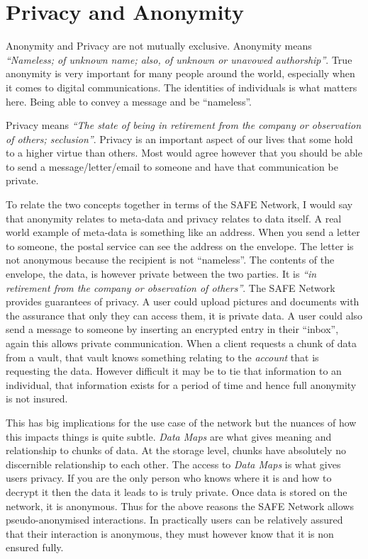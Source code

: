 \section{Privacy and Anonymity}

Anonymity and Privacy are not mutually exclusive. Anonymity means \textit{``Nameless; of unknown name; also, of unknown or unavowed authorship''}\cite{anonymous}. True anonymity is very important for many people around the world, especially when it comes to digital communications. The identities of individuals is what matters here. Being able to convey a message and be ``nameless''. 

Privacy means \textit{``The state of being in retirement from the company or observation of others; seclusion''}\cite{privacy}. Privacy is an important aspect of our lives that some hold to a higher virtue than others. Most would agree however that you should be able to send a message/letter/email to someone and have that communication be private.

To relate the two concepts together in terms of the SAFE Network, I would say that anonymity relates to meta-data and privacy relates to data itself. A real world example of meta-data is something like an address. When you send a letter to someone, the postal service can see the address on the envelope. The letter is not anonymous because the recipient is not ``nameless''. The contents of the envelope, the data, is however private between the two parties. It is \textit{``in retirement from the company or observation of others''}. The SAFE Network provides guarantees of privacy. A user could upload pictures and documents with the assurance that only they can access them, it is private data. A user could also send a message to someone by inserting an encrypted entry in their ``inbox'', again this allows private communication. When a client requests a chunk of data from a vault, that vault knows something relating to the \textit{account} that is requesting the data. However difficult it may be to tie that information to an individual, that information exists for a period of time and hence full anonymity is not insured.

This has big implications for the use case of the network but the nuances of how this impacts things is quite subtle. \textit{Data Maps} are what gives meaning and relationship to chunks of data. At the storage level, chunks have absolutely no discernible relationship to each other. The access to \textit{Data Maps} is what gives users privacy. If you are the only person who knows where it is and how to decrypt it then the data it leads to is truly private. Once data is stored on the network, it is anonymous. Thus for the above reasons the SAFE Network allows pseudo-anonymised interactions. In practically users can be relatively assured that their interaction is anonymous, they must however know that it is non ensured fully.

